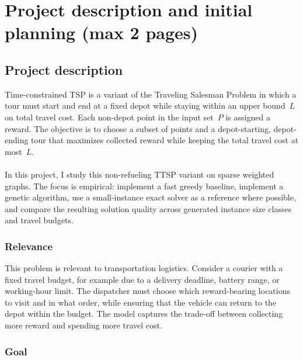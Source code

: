\documentclass[report,english,cleveref,autoref,a4paper]{lipics-v2021}
\newcommand{\explanation}[1]{\emph{Explanation:} #1}
\newcommand{\explanation}[1]{}
\begin{document}
\section{Project description and initial planning (max 2 pages)}

\subsection{Project description}
\label{subsec:project}

Time-constrained TSP is a variant of the Traveling Salesman Problem in which a tour must start and end at a fixed depot while staying within an upper bound~$L$ on total travel cost. Each non-depot point in the input set~$P$ is assigned a reward. The objective is to choose a subset of points and a depot-starting, depot-ending tour that maximizes collected reward while keeping the total travel cost at most~$L$.
\\ \\
In this project, I study this non-refueling TTSP variant on sparse weighted graphs. The focus is empirical: implement a fast greedy baseline, implement a genetic algorithm, use a small-instance exact solver as a reference where possible, and compare the resulting solution quality across generated instance size classes and travel budgets.

\subsubsection{Relevance}

This problem is relevant to transportation logistics. Consider a courier with a fixed travel budget, for example due to a delivery deadline, battery range, or working-hour limit. The dispatcher must choose which reward-bearing locations to visit and in what order, while ensuring that the vehicle can return to the depot within the budget. The model captures the trade-off between collecting more reward and spending more travel cost.

\subsubsection{Goal}
\end{document}

